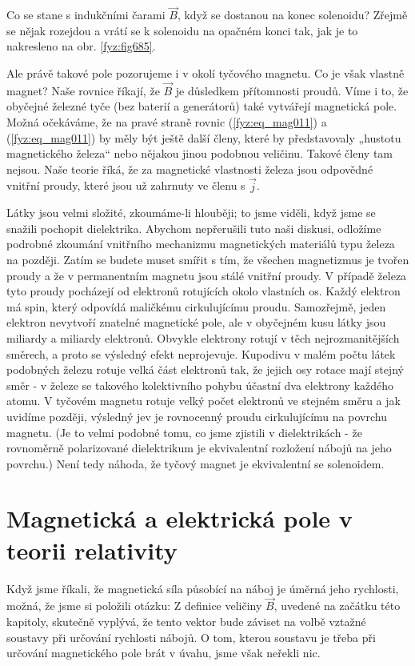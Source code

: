    Co se stane s indukčními čarami \(\vec{B}\), když se dostanou na konec solenoidu? Zřejmě se
    nějak rozejdou a vrátí se k solenoidu na opačném konci tak, jak je to nakresleno na obr.
    \ref{fyz:fig685}.

    Ale právě takové pole pozorujeme i v okolí tyčového magnetu. Co je však vlastně magnet? Naše
    rovnice říkají, že \(\vec{B}\) je důsledkem přítomnosti proudů. Víme i to, že obyčejné železné
    tyče (bez baterií a generátorů) také vytvářejí magnetická pole. Možná očekáváme, že na pravé
    straně rovnic (\ref{fyz:eq_mag011}) a (\ref{fyz:eq_mag011}) by měly být ještě další členy, které
    by představovaly „hustotu magnetického železa“ nebo nějakou jinou podobnou veličinu. Takové
    členy tam nejsou. Naše teorie říká, že za magnetické vlastnosti železa jsou odpovědné vnitřní
    proudy, které jsou už zahrnuty ve členu s \(\vec{j}\).

    Látky jsou velmi složité, zkoumáme-li hlouběji; to jsme viděli, když jsme se snažili pochopit 
    dielektrika. Abychom nepřerušili tuto naši diskusi, odložíme podrobné zkoumání vnitřního
    mechanizmu magnetických materiálů typu železa na později. Zatím se budete muset smířit s tím, že
    všechen magnetizmus je tvořen proudy a že v permanentním magnetu jsou stálé vnitřní proudy. V
    případě železa tyto proudy pocházejí od elektronů rotujících okolo vlastních os. Každý elektron
    má spin, který odpovídá maličkému cirkulujícímu proudu. Samozřejmě, jeden elektron nevytvoří
    znatelné magnetické pole, ale v obyčejném kusu látky jsou miliardy a miliardy elektronů. Obvykle
    elektrony rotují v těch nejrozmanitějších směrech, a proto se výsledný efekt neprojevuje.
    Kupodivu v malém počtu látek podobných železu rotuje velká část elektronů tak, že jejich osy
    rotace mají stejný směr - v železe se takového kolektivního pohybu účastní dva elektrony každého
    atomu. V tyčovém magnetu rotuje velký počet elektronů ve stejném směru a jak uvidíme později,
    výsledný jev je rovnocenný proudu cirkulujícímu na povrchu magnetu. (Je to velmi podobné tomu,
    co jsme zjistili v dielektrikách - že rovnoměrně polarizované dielektrikum je ekvivalentní
    rozložení nábojů na jeho povrchu.) Není tedy náhoda, že tyčový magnet je ekvivalentní se
    solenoidem.

  \section{Magnetická a elektrická pole v teorii relativity}\label{fyz:IIchapXIIIsecVI}
    Když jsme říkali, že magnetická síla působící na náboj je úměrná jeho rychlosti, možná, že jsme
    si položili otázku:  Z definice
    veličiny \(\vec{B}\), uvedené na začátku této kapitoly, skutečně vyplývá, že tento vektor bude
    záviset na volbě vztažné soustavy při určování rychlosti nábojů. O tom, kterou soustavu je třeba
    při určování magnetického pole brát v úvahu, jsme však neřekli nic.
    
